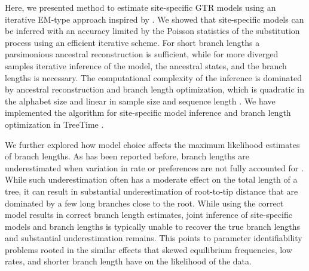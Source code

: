 \documentclass[aps,rmp,twocolumn,linenumbers]{revtex4-1}
\begin{document}
Here, we presented method to estimate site-specific GTR models using an iterative EM-type approach inspired by \citet{bruno1996modeling}.
We showed that site-specific models can be inferred with an accuracy limited by the Poisson statistics of the substitution process using an efficient iterative scheme.
For short branch lengths a parsimonious ancestral reconstruction is sufficient, while for more diverged samples iterative inference of the model, the ancestral states, and the branch lengths is necessary.
The computational complexity of the inference is dominated by ancestral reconstruction and branch length optimization, which is quadratic in the alphabet size and linear in sample size and sequence length \citep{felsenstein2004inferring}.
We have implemented the algorithm for site-specific model inference and branch length optimization in TreeTime \citep{sagulenko2017treetime}.


We further explored how model choice affects the maximum likelihood estimates of branch lengths.
As has been reported before, branch lengths are underestimated when variation in rate or preferences are not fully accounted for \citep{halpern_evolutionary_1998,hilton_modeling_2018}.
While such underestimation often has a moderate effect on the total length of a tree, it can result in substantial underestimation of root-to-tip distance that are dominated by a few long branches close to the root.
While using the correct model results in correct branch length estimates, joint inference of site-specific models and branch lengths is typically unable to recover the true branch lengths and substantial underestimation remains.
This points to parameter identifiability problems rooted in the similar effects that skewed equilibrium frequencies, low rates, and shorter branch length have on the likelihood of the data.
\end{document}
